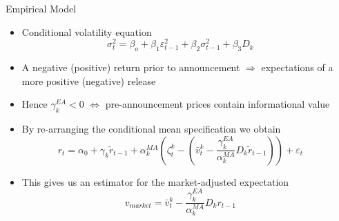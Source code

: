 \documentclass[final]{beamer}
\begin{document}
\begin{frame}
\begin{columns}[t]
\begin{column}{.43 \linewidth}
\begin{block}{Empirical Model}
\begin{itemize}
\item Conditional volatility equation\[
\sigma _{t}^{2}=\beta _{o}+\beta _{1}\varepsilon _{t-1}^{2}+\beta _{2}\sigma
_{t-1}^{2}+\beta _{3}D_{k}
\]

\item A negative (positive) return prior to announcement $\Rightarrow $ expectations of a more positive (negative) release

\item Hence $\gamma _{k}^{EA}<0$ $\Leftrightarrow$ pre-announcement prices contain informational value

\item By re-arranging the conditional mean specification we obtain
\[
r_{t}=\alpha _{0}+\gamma _{k}\tilde{r}_{t-1}+\alpha _{k}^{MA}\left( \zeta
_{t}^{k}-\left( \bar{v}_{t}^{k}-\frac{\gamma _{k}^{EA}}{\alpha _{k}^{MA}}D_{k}\tilde{r}_{t-1}\right) \right) +\varepsilon _{t}
\]

\item This gives us an estimator for the market-adjusted expectation
\[
v_{market}=\bar{v}_{t}^{k}-\frac{\gamma _{k}^{EA}}{\alpha _{k}^{MA}}D_{k}r_{t-1}
\]
\end{itemize}
\end{block}%

\end{column}%

\begin{column}{.53 \linewidth}%

\begin{columns}[c]%

\begin{column}{.48 \linewidth}%

\vspace{2cm}%


\end{column}
\end{columns}
\end{column}
\end{columns}
\end{frame}
\end{document}
